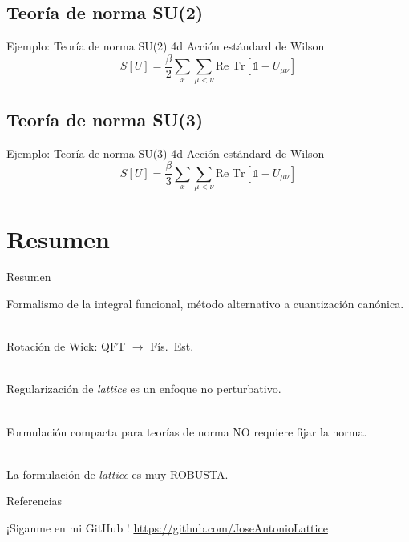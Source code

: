 \documentclass[11pt]{beamer}
\begin{document}
\subsection{Teoría de norma SU(2)}
\begin{frame}{Ejemplo: Teoría de norma SU(2) 4d}
Acción estándard de Wilson
$$ S[U] = \frac{\beta}{2}\sum_{x}\sum_{\mu < \nu} \text{Re Tr} \left[\mathds{1} - U_{\mu\nu} \right] $$
\end{frame}

\subsection{Teoría de norma SU(3)}
\begin{frame}{Ejemplo: Teoría de norma SU(3) 4d}
Acción estándard de Wilson
$$ S[U] = \frac{\beta}{3}\sum_{x}\sum_{\mu < \nu} \text{Re Tr} \left[\mathds{1} - U_{\mu\nu} \right] $$
\end{frame}

\section{Resumen}
\begin{frame}{Resumen}

Formalismo de la integral funcional, método alternativo a cuantización canónica. \\~

Rotación de Wick: QFT $\to$ Fís.\ Est.\  \\~

Regularización de \emph{lattice} es un enfoque no perturbativo. \\~

Formulación compacta para teorías de norma NO requiere fijar la norma. \\~

La formulación de \emph{lattice} es muy ROBUSTA.
    
\end{frame}

\begin{frame}{Referencias}

¡Siganme en mi GitHub \faGithub !
\url{https://github.com/JoseAntonioLattice}
\end{frame}
\end{document}
